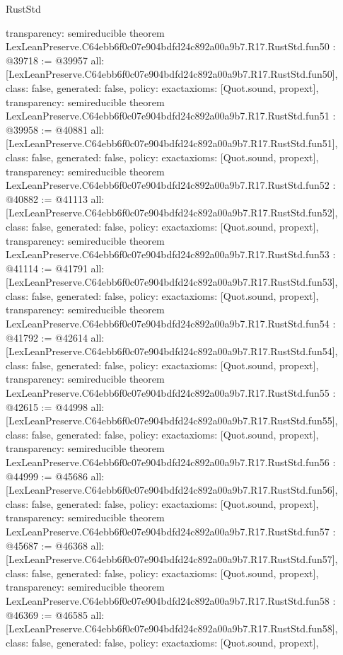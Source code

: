 \begin{lexlean}{RustStd}
\begin{coremodule}
{  transparency: semireducible
}
theorem LexLeanPreserve.C64ebb6f0c07e904bdfd24c892a00a9b7.R17.RustStd.fun50 : @39718 := @39957 {
  all: [LexLeanPreserve.C64ebb6f0c07e904bdfd24c892a00a9b7.R17.RustStd.fun50],
  class: false,
  generated: false,
  policy: exact{axioms: [Quot.sound, propext]},
  transparency: semireducible
}
theorem LexLeanPreserve.C64ebb6f0c07e904bdfd24c892a00a9b7.R17.RustStd.fun51 : @39958 := @40881 {
  all: [LexLeanPreserve.C64ebb6f0c07e904bdfd24c892a00a9b7.R17.RustStd.fun51],
  class: false,
  generated: false,
  policy: exact{axioms: [Quot.sound, propext]},
  transparency: semireducible
}
theorem LexLeanPreserve.C64ebb6f0c07e904bdfd24c892a00a9b7.R17.RustStd.fun52 : @40882 := @41113 {
  all: [LexLeanPreserve.C64ebb6f0c07e904bdfd24c892a00a9b7.R17.RustStd.fun52],
  class: false,
  generated: false,
  policy: exact{axioms: [Quot.sound, propext]},
  transparency: semireducible
}
theorem LexLeanPreserve.C64ebb6f0c07e904bdfd24c892a00a9b7.R17.RustStd.fun53 : @41114 := @41791 {
  all: [LexLeanPreserve.C64ebb6f0c07e904bdfd24c892a00a9b7.R17.RustStd.fun53],
  class: false,
  generated: false,
  policy: exact{axioms: [Quot.sound, propext]},
  transparency: semireducible
}
theorem LexLeanPreserve.C64ebb6f0c07e904bdfd24c892a00a9b7.R17.RustStd.fun54 : @41792 := @42614 {
  all: [LexLeanPreserve.C64ebb6f0c07e904bdfd24c892a00a9b7.R17.RustStd.fun54],
  class: false,
  generated: false,
  policy: exact{axioms: [Quot.sound, propext]},
  transparency: semireducible
}
theorem LexLeanPreserve.C64ebb6f0c07e904bdfd24c892a00a9b7.R17.RustStd.fun55 : @42615 := @44998 {
  all: [LexLeanPreserve.C64ebb6f0c07e904bdfd24c892a00a9b7.R17.RustStd.fun55],
  class: false,
  generated: false,
  policy: exact{axioms: [Quot.sound, propext]},
  transparency: semireducible
}
theorem LexLeanPreserve.C64ebb6f0c07e904bdfd24c892a00a9b7.R17.RustStd.fun56 : @44999 := @45686 {
  all: [LexLeanPreserve.C64ebb6f0c07e904bdfd24c892a00a9b7.R17.RustStd.fun56],
  class: false,
  generated: false,
  policy: exact{axioms: [Quot.sound, propext]},
  transparency: semireducible
}
theorem LexLeanPreserve.C64ebb6f0c07e904bdfd24c892a00a9b7.R17.RustStd.fun57 : @45687 := @46368 {
  all: [LexLeanPreserve.C64ebb6f0c07e904bdfd24c892a00a9b7.R17.RustStd.fun57],
  class: false,
  generated: false,
  policy: exact{axioms: [Quot.sound, propext]},
  transparency: semireducible
}
theorem LexLeanPreserve.C64ebb6f0c07e904bdfd24c892a00a9b7.R17.RustStd.fun58 : @46369 := @46585 {
  all: [LexLeanPreserve.C64ebb6f0c07e904bdfd24c892a00a9b7.R17.RustStd.fun58],
  class: false,
  generated: false,
  policy: exact{axioms: [Quot.sound, propext]},
}
\end{coremodule}
\end{lexlean}
